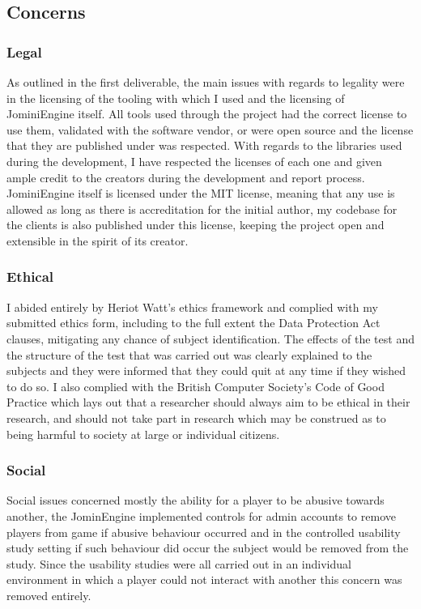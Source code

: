 \documentclass{article}
\begin{document}
\subsection{Concerns}

\subsubsection{Legal}

As outlined in the first deliverable, the main issues with regards to legality were in the licensing of the tooling with which I used and the licensing of JominiEngine itself. All tools used through the project had the correct license to use them, validated with the software vendor, or were open source and the license that they are published under was respected. With regards to the libraries used during the development, I have respected the licenses of each one and given ample credit to the creators during the development and report process. JominiEngine itself is licensed under the MIT license, meaning that any use is allowed as long as there is accreditation for the initial author, my codebase for the clients is also published under this license, keeping the project open and extensible in the spirit of its creator. 

\subsubsection{Ethical}

I abided entirely by Heriot Watt’s ethics framework and complied with my submitted ethics form, including to the full extent the Data Protection Act clauses, mitigating any chance of subject identification. The effects of the test and the structure of the test that was carried out was clearly explained to the subjects and they were informed that they could quit at any time if they wished to do so. I also complied with the British Computer Society's Code of Good Practice which lays out that a researcher should always aim to be ethical in their research, and should not take part in research which may be construed as to being harmful to society at large or individual citizens. 

\subsubsection{Social}

Social issues concerned mostly the ability for a player to be abusive towards another, the JominEngine implemented controls for admin accounts to remove players from game if abusive behaviour occurred and in the controlled usability study setting if such behaviour did occur the subject would be removed from the study. Since the usability studies were all carried out in an individual environment in which a player could not interact with another this concern was removed entirely. 
\end{document}
